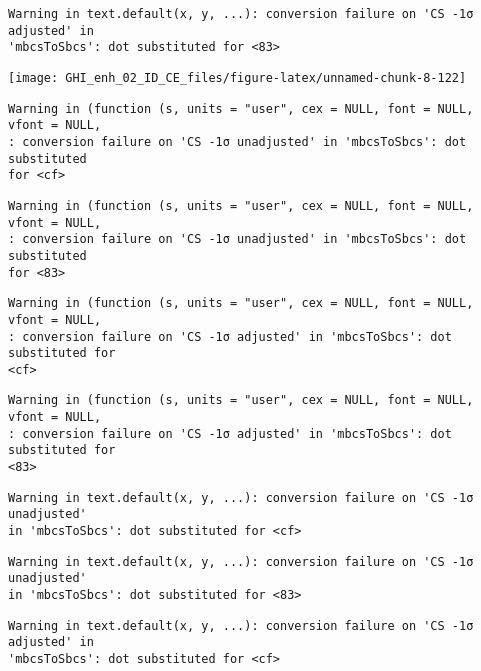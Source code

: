 \documentclass[
  10pt,
  a4paper,oneside]{article}
\begin{document}
\begin{verbatim}
Warning in text.default(x, y, ...): conversion failure on 'CS -1σ adjusted' in
'mbcsToSbcs': dot substituted for <83>
\end{verbatim}

\begin{center}\texttt{[image: GHI\_enh\_02\_ID\_CE\_files/figure-latex/unnamed-chunk-8-122]} \end{center}

\begin{verbatim}
Warning in (function (s, units = "user", cex = NULL, font = NULL, vfont = NULL,
: conversion failure on 'CS -1σ unadjusted' in 'mbcsToSbcs': dot substituted
for <cf>
\end{verbatim}

\begin{verbatim}
Warning in (function (s, units = "user", cex = NULL, font = NULL, vfont = NULL,
: conversion failure on 'CS -1σ unadjusted' in 'mbcsToSbcs': dot substituted
for <83>
\end{verbatim}

\begin{verbatim}
Warning in (function (s, units = "user", cex = NULL, font = NULL, vfont = NULL,
: conversion failure on 'CS -1σ adjusted' in 'mbcsToSbcs': dot substituted for
<cf>
\end{verbatim}

\begin{verbatim}
Warning in (function (s, units = "user", cex = NULL, font = NULL, vfont = NULL,
: conversion failure on 'CS -1σ adjusted' in 'mbcsToSbcs': dot substituted for
<83>
\end{verbatim}

\begin{verbatim}
Warning in text.default(x, y, ...): conversion failure on 'CS -1σ unadjusted'
in 'mbcsToSbcs': dot substituted for <cf>
\end{verbatim}

\begin{verbatim}
Warning in text.default(x, y, ...): conversion failure on 'CS -1σ unadjusted'
in 'mbcsToSbcs': dot substituted for <83>
\end{verbatim}

\begin{verbatim}
Warning in text.default(x, y, ...): conversion failure on 'CS -1σ adjusted' in
'mbcsToSbcs': dot substituted for <cf>
\end{verbatim}
\end{document}
